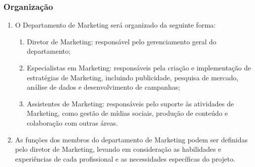         \subsubsection{Organização}
            \begin{enumerate}
                \item O Departamento de Marketing será organizado da seguinte forma:
                \begin{enumerate}
                    \item Diretor de Marketing: responsável pelo gerenciamento geral do departamento;
                    \item Especialistas em Marketing: responsáveis pela criação e implementação de estratégias de Marketing, incluindo publicidade, pesquisa de mercado, análise de dados e desenvolvimento de campanhas;
                    \item Assistentes de Marketing: responsáveis pelo suporte às atividades de Marketing, como gestão de mídias sociais, produção de conteúdo e colaboração com outras áreas.
                \end{enumerate}
                \item As funções dos membros do departamento de Marketing podem ser definidas pelo diretor de Marketing, levando em consideração as habilidades e experiências de cada profissional e as necessidades específicas do projeto.
            \end{enumerate}
